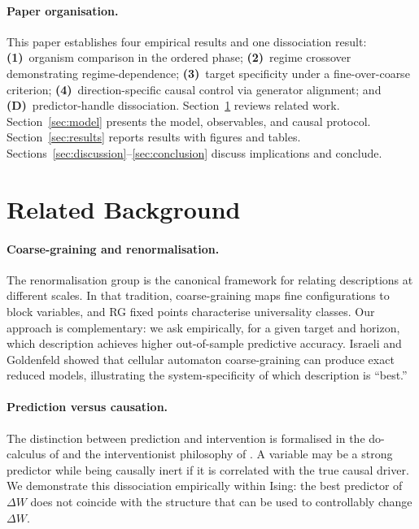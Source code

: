 \documentclass[11pt,a4paper]{article}
\begin{document}
\paragraph{Paper organisation.}
This paper establishes four empirical results and one dissociation result:
\textbf{(1)}~organism comparison in the ordered phase;
\textbf{(2)}~regime crossover demonstrating regime-dependence;
\textbf{(3)}~target specificity under a fine-over-coarse criterion;
\textbf{(4)}~direction-specific causal control via generator alignment;
and \textbf{(D)}~predictor-handle dissociation.
Section~\ref{sec:background} reviews related work.
Section~\ref{sec:model} presents the model, observables, and causal protocol.
Section~\ref{sec:results} reports results with figures and tables.
Sections~\ref{sec:discussion}--\ref{sec:conclusion} discuss implications and conclude.

\section{Related Background}
\label{sec:background}

\paragraph{Coarse-graining and renormalisation.}
The renormalisation group \citep{kadanoff1966,wilson1975} is the
canonical framework for relating descriptions at different scales.
In that tradition, coarse-graining maps fine configurations to block
variables, and RG fixed points characterise universality classes.
Our approach is complementary: we ask empirically, for a given target and
horizon, which description achieves higher out-of-sample predictive accuracy.
Israeli and Goldenfeld \citeyearpar{israeli2006} showed that cellular
automaton coarse-graining can produce exact reduced models, illustrating
the system-specificity of which description is ``best.''

\paragraph{Prediction versus causation.}
The distinction between prediction and intervention is formalised in the
do-calculus of \citet{pearl2009} and the interventionist philosophy of
\citet{woodward2003}.
A variable may be a strong predictor while being causally inert if it is
correlated with the true causal driver.
We demonstrate this dissociation empirically within Ising: the best
predictor of $\Delta W$ does not coincide with the structure that can be
used to controllably change $\Delta W$.
\end{document}
